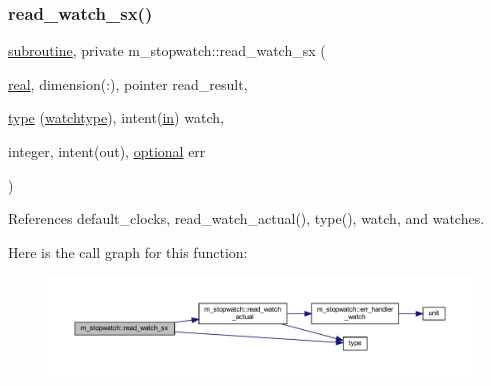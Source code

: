 \subsubsection{\texorpdfstring{read\+\_\+watch\+\_\+sx()}{read\_watch\_sx()}}
{\footnotesize\ttfamily \hyperlink{M__stopwatch_83_8txt_acfbcff50169d691ff02d4a123ed70482}{subroutine}, private m\+\_\+stopwatch\+::read\+\_\+watch\+\_\+sx (\begin{DoxyParamCaption}\item[{\hyperlink{read__watch_83_8txt_abdb62bde002f38ef75f810d3a905a823}{real}, dimension(\+:), pointer}]{read\+\_\+result,  }\item[{\hyperlink{stop__watch_83_8txt_a70f0ead91c32e25323c03265aa302c1c}{type} (\hyperlink{structm__stopwatch_1_1watchtype}{watchtype}), intent(\hyperlink{M__journal_83_8txt_afce72651d1eed785a2132bee863b2f38}{in})}]{watch,  }\item[{integer, intent(out), \hyperlink{option__stopwatch_83_8txt_aa4ece75e7acf58a4843f70fe18c3ade5}{optional}}]{err }\end{DoxyParamCaption})\hspace{0.3cm}{\ttfamily [private]}}



References default\+\_\+clocks, read\+\_\+watch\+\_\+actual(), type(), watch, and watches.

Here is the call graph for this function\+:
\nopagebreak
\begin{figure}[H]
\begin{center}
\leavevmode
\includegraphics[width=350pt]{namespacem__stopwatch_ae67f8aee930e9258b83b5a551120e4bd_cgraph}
\end{center}
\end{figure}
\mbox{\label{namespacem__stopwatch_ab6cfebb215292cc061f472aedb2dbb93}} 

